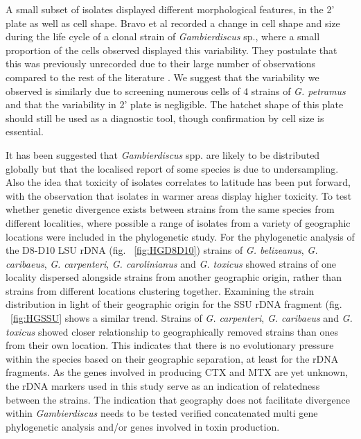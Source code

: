 \documentclass[12pt]{article}
\begin{document}
A small subset of isolates displayed different morphological features, in the 2' plate as well as cell shape. Bravo et al recorded a change in cell shape and size during the life cycle of a clonal strain of \emph{Gambierdiscus} sp., where a small proportion of the cells observed displayed this variability. They postulate that this was previously unrecorded due to their large number of observations compared to the rest of the literature \cite{bravo2014cellular}. We suggest that the variability we observed is similarly due to screening numerous cells of 4 strains of \emph{G. petramus} and that the variability in 2' plate is negligible. The hatchet shape of this plate should still be used as a diagnostic tool, though confirmation by cell size is essential.

 It has been suggested that \emph{Gambierdiscus} spp. are likely to be distributed globally but that the localised report of some species is due to undersampling. Also the idea that toxicity of isolates correlates to latitude has been put forward, with the observation that isolates in warmer areas display higher toxicity. To test whether genetic divergence exists between strains from the same species from different localities, where possible a range of isolates from a variety of geographic locations were included in the phylogenetic study. For the phylogenetic analysis of the D8-D10 LSU rDNA (fig. ~\ref{fig:HGD8D10}) strains of \emph{G. belizeanus}, \emph{G. caribaeus}, \emph{G. carpenteri},  \emph{G. carolinianus} and \emph{G. toxicus} showed strains of one locality dispersed alongside strains from another geographic origin, rather than strains from different locations clustering together. Examining the strain distribution in light of their geographic origin for the SSU rDNA fragment (fig. ~\ref{fig:HGSSU} shows a similar trend. Strains of \emph{G. carpenteri}, \emph{G. caribaeus} and \emph{G. toxicus} showed closer relationship to geographically removed strains than ones from their own location.
This indicates that there is no evolutionary pressure within the species based on their geographic separation, at least for the rDNA fragments.
As the genes involved in producing CTX and MTX are yet unknown, the rDNA markers used in this study serve as an indication of relatedness between the strains. The indication that geography does not facilitate divergence within \emph{Gambierdiscus} needs to be tested verified concatenated multi gene phylogenetic analysis and/or genes involved in toxin production.
\end{document}
